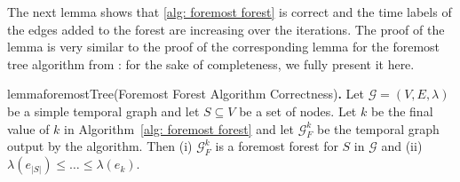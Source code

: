 \documentclass[a4paper,11pt]{article}
\theoremstyle{definition}
\theoremstyle{plain}
\newcommand{\GGG}{\mathcal{G}}
\begin{document}
The next lemma shows that \cref{alg: foremost forest} is correct and the time labels of the edges added to the forest
are increasing over the iterations. The proof of the lemma is very similar to the proof of the corresponding lemma for the foremost tree algorithm
from \cite{CasteigtsRRZ21}: for the sake of completeness, we fully present it here.

\begin{restatable}{lemma}{foremostTree}{\normalfont (Foremost Forest Algorithm Correctness)}\textbf{.}
  \label{lem:foremostTree}
  Let $\GGG=(V, E, \lambda)$ be a simple temporal graph and let $S\subseteq V$ be a set of nodes. Let $k$ be the final value of $k$ in Algorithm~\ref{alg: foremost forest} and let $\GGG^k_F$ be the temporal graph output by the algorithm. Then (i) $\GGG^k_F$ is a foremost forest for $S$ in $\GGG$ and (ii) $\lambda(e_{|S|}) \leq \ldots \leq \lambda(e_{k})$.
\end{restatable}
\end{document}

